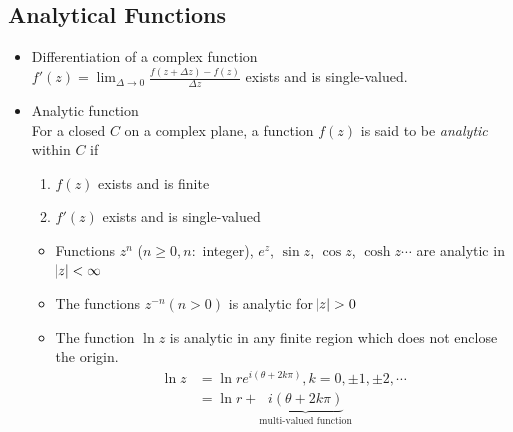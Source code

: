 \subsection{Analytical Functions}
\begin{itemize}
\item Differentiation of a complex function\\
$\displaystyle f'(z) = \lim_{\Delta\to 0}\frac{f(z+\Delta z)-f(z)}{\Delta z}$ exists and is single-valued.
\item Analytic function\\
For a closed $C$ on a complex plane, a function $f(z)$ is said to be \emph{analytic} within $C$ if
\begin{enumerate}[label = \protect\circled{\arabic*}]
\item $f(z)$ exists and is finite 
\item $f'(z)$ exists and is single-valued
\end{enumerate}
\begin{itemize}
\item Functions $z^n$ ($n\geq 0,n\colon$ integer), $e^z$, $\sin z$, $\cos z$, $\cosh z\cdots$ are analytic in $\abs{z}<\infty$
\item The functions $z^{-n}(n>0)$ is analytic for $\abs{z}>0$
\item The function $\ln z$ is analytic in any finite region which does not enclose the origin.
\begin{align*}
\ln z 
&= \ln re^{i\left(\theta+2k\pi\right)},k=0,\pm 1, \pm 2, \cdots \\
&= \ln r + \underbrace{i\left(\theta+2k\pi\right)}_{\text{multi-valued function}}
\end{align*}
\end{itemize}
\end{itemize}
